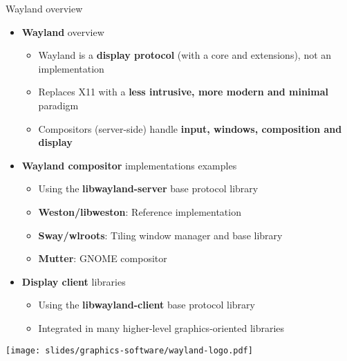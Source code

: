 \begin{frame}{Wayland overview}
  \begin{itemize}
  \item \textbf{Wayland} overview
    \begin{itemize}
    \item Wayland is a \textbf{display protocol} (with a core and extensions), not an implementation
    \item Replaces X11 with a \textbf{less intrusive, more modern and minimal} paradigm
    \item Compositors (server-side) handle \textbf{input, windows, composition and display}
    \end{itemize}
  \end{itemize}
  \begin{minipage}[b]{0.8\textwidth}
  \begin{itemize}
  \item \textbf{Wayland compositor} implementations examples
    \begin{itemize}
    \item Using the \textbf{libwayland-server} base protocol library
    \item \textbf{Weston/libweston}: Reference implementation
    \item \textbf{Sway/wlroots}: Tiling window manager and base library
    \item \textbf{Mutter}: GNOME compositor
    \end{itemize}
  \item \textbf{Display client} libraries
    \begin{itemize}
    \item Using the \textbf{libwayland-client} base protocol library
    \item Integrated in many higher-level graphics-oriented libraries
    \end{itemize}
  \end{itemize}
  \end{minipage}
  \begin{minipage}[b]{0.15\textwidth}
  \texttt{[image: slides/graphics-software/wayland-logo.pdf]}
  \end{minipage}
\end{frame}

